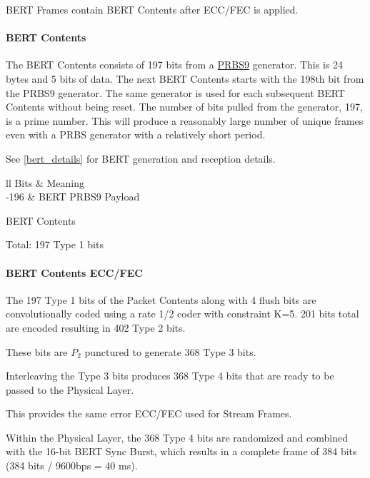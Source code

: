 \documentclass[a4paper,11pt,oneside]{book}
\begin{document}
BERT Frames contain BERT Contents after ECC/FEC is applied.

\paragraph{BERT Contents}

The BERT Contents consists of 197 bits from a \href{https://en.wikipedia.org/wiki/Pseudorandom_binary_sequence}{PRBS9} generator. This is 24 bytes and 5 bits of data. The next BERT Contents starts with the 198th bit from the PRBS9 generator. The same generator is used for each subsequent BERT Contents without being reset. The number of bits pulled from the generator, 197, is a prime number. This will produce a reasonably large number of unique frames even with a PRBS generator with a relatively short period.

See \autoref{bert_details} for BERT generation and reception details.

\begin{table}[H]
	\centering
	\begin{tblr}{ll}
		\hline
		Bits & Meaning \\
		-196 & BERT PRBS9 Payload \\
		\hline[2px]
	\end{tblr}
	\caption{BERT Contents}
\end{table}

Total: 197 Type 1 bits

\paragraph{BERT Contents ECC/FEC}

The 197 Type 1 bits of the Packet Contents along with 4 flush bits are convolutionally coded using a rate 1/2 coder with constraint K=5. 201 bits total are encoded resulting in 402 Type 2 bits.

These bits are $P_2$ punctured to generate 368 Type 3 bits.

Interleaving the Type 3 bits produces 368 Type 4 bits that are ready to be passed to the Physical Layer.

This provides the same error ECC/FEC used for Stream Frames.

Within the Physical Layer, the 368 Type 4 bits are randomized and combined with the 16-bit BERT Sync Burst, which results in a complete frame of 384 bits (384 bits / 9600bps = 40 ms).
\end{document}
